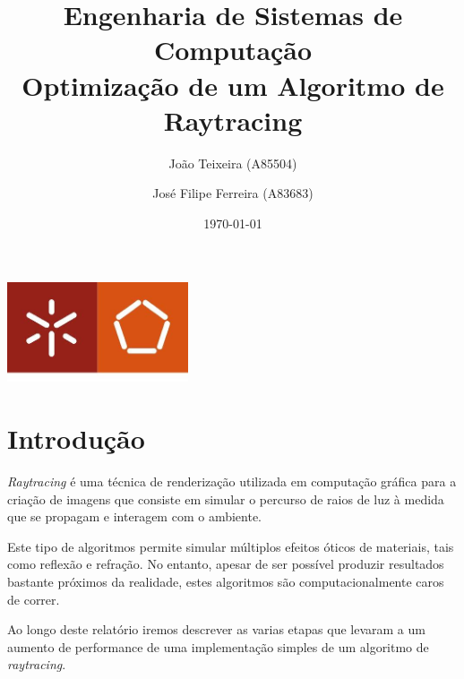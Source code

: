 \documentclass[a4paper]{report}
\begin{document}
\title{Engenharia de Sistemas de Computação\\Optimização de um Algoritmo de Raytracing}
\author{João Teixeira (A85504) \and José Filipe Ferreira (A83683)}
\date{\today}

\begin{center}
    \begin{minipage}{0.75\linewidth}
        \centering
        \includegraphics[width=0.4\textwidth]{images/eng.jpeg}\par\vspace{1cm}
        \vspace{1.5cm}
        \href{https://www.uminho.pt/PT}
        {\color{black}{\scshape\LARGE Universidade do Minho}} \par
        \vspace{1cm}
        \href{https://www.di.uminho.pt/}
        {\color{black}{\scshape\Large Departamento de Informática}} \par
        \vspace{1.5cm}
        \maketitle
    \end{minipage}
\end{center}

\tableofcontents

\pagebreak

\chapter{Introdução}
\textit{Raytracing} é uma técnica de renderização utilizada em computação
gráfica para a criação de imagens que consiste em simular o percurso de raios de
luz à medida que se propagam e interagem com o ambiente.

Este tipo de algoritmos permite simular múltiplos efeitos óticos de materiais,
tais como reflexão e refração. No entanto, apesar de ser possível produzir
resultados bastante próximos da realidade, estes algoritmos são
computacionalmente caros de correr.

Ao longo deste relatório iremos descrever as varias etapas que levaram a um
aumento de performance de uma implementação simples de um algoritmo de
\textit{raytracing}.
\end{document}
